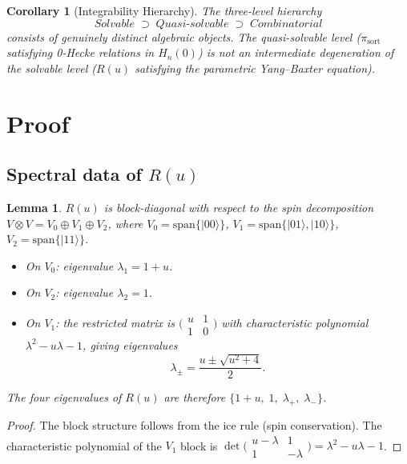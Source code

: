 \documentclass[11pt]{article}
\newtheorem{lemma}[theorem]{Lemma}
\newtheorem{corollary}[theorem]{Corollary}
\theoremstyle{remark}
\newcommand{\ket}[1]{|#1\rangle}
\newcommand{\pisort}{\pi_{\mathrm{sort}}}
\begin{document}
\begin{corollary}[Integrability Hierarchy]\label{cor:hierarchy}
The three-level hierarchy
\[
  \textit{Solvable} \;\supset\; \textit{Quasi-solvable}
  \;\supset\; \textit{Combinatorial}
\]
consists of genuinely distinct algebraic objects. The quasi-solvable level
($\pisort$ satisfying 0-Hecke relations in $H_n(0)$) is not an intermediate
degeneration of the solvable level ($R(u)$ satisfying the parametric
Yang--Baxter equation).
\end{corollary}

\section{Proof}

\subsection{Spectral data of $R(u)$}

\begin{lemma}\label{lem:block}
$R(u)$ is block-diagonal with respect to the spin decomposition
$V \otimes V = V_0 \oplus V_1 \oplus V_2$, where
$V_0 = \mathrm{span}\{\ket{00}\}$,
$V_1 = \mathrm{span}\{\ket{01}, \ket{10}\}$,
$V_2 = \mathrm{span}\{\ket{11}\}$.
\begin{itemize}
  \item On $V_0$: eigenvalue $\lambda_1 = 1+u$.
  \item On $V_2$: eigenvalue $\lambda_2 = 1$.
  \item On $V_1$: the restricted matrix is
    $\bigl(\begin{smallmatrix} u & 1 \\ 1 & 0 \end{smallmatrix}\bigr)$
    with characteristic polynomial $\lambda^2 - u\lambda - 1$, giving
    eigenvalues
    \begin{equation}\label{eq:lambdapm}
      \lambda_\pm = \frac{u \pm \sqrt{u^2 + 4}}{2}.
    \end{equation}
\end{itemize}
The four eigenvalues of $R(u)$ are therefore
$\{1+u,\; 1,\; \lambda_+,\; \lambda_-\}$.
\end{lemma}

\begin{proof}
The block structure follows from the ice rule (spin conservation).
The characteristic polynomial of the $V_1$ block is
$\det\bigl(\begin{smallmatrix} u-\lambda & 1 \\ 1 & -\lambda
\end{smallmatrix}\bigr) = \lambda^2 - u\lambda - 1$.
\end{proof}
\end{document}
